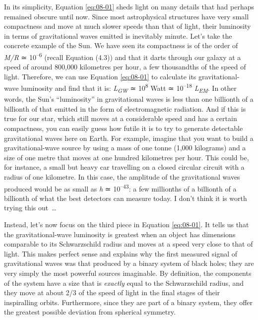 In its simplicity, Equation \eqref{eq:08-01} sheds light on many details that had perhaps remained
obscure until now. Since most astrophysical structures have very small compactness and
move at much slower speeds than that of light, their luminosity in terms of
gravitational waves emitted is inevitably minute. Let's take the concrete example of the
Sun. We have seen its compactness is of the order of \emph{M/R} ≃
10\textsuperscript{--6} (recall Equation (4.3)) and that it darts through our galaxy at
a speed of around 800,000 kilometres per hour, a few thousandths of the speed of light.
Therefore, we can use Equation \eqref{eq:08-01} to calculate its gravitational-wave luminosity and
find that it is: \emph{L\textsubscript{GW}} ≃ 10\textsuperscript{8} Watt ≃
10\textsuperscript{--18} \emph{L\textsubscript{EM}}. In other words, the Sun's
``luminosity''  in gravitational waves is less than one billionth of
a billionth of that emitted in the form of electromagnetic radiation.
And if this is true for our star, which still moves at a considerable speed and has a
certain compactness, you can easily guess how futile it is to try to generate detectable
gravitational waves here on Earth. For example, imagine that you want to build a
gravitational-wave source by using a mass of one tonne (1,000 kilograms) and a size of
one metre that moves at one hundred kilometres per hour. This could be, for instance, a
small but heavy car travelling on a closed circular circuit with a radius of one
kilometre. In this case, the amplitude of the gravitational waves produced would be as
small as \emph{h} ≃ 10\textsuperscript{--43}: a few millionths of a billionth of a
billionth of what the best detectors can measure today. I don't think it is worth trying
this out~\ldots{}

Instead, let's now focus on the third piece in Equation \eqref{eq:08-01}. It tells us that the
gravitational-wave luminosity is greatest when an object has
dimensions comparable to its Schwarzschild radius and moves at a speed very close to
that of light. This makes perfect sense and explains why the first measured signal of
gravitational waves was that produced by a binary system of black holes; they are very
simply the most powerful sources imaginable. By definition, the components of the system
have a size that is \emph{exactly} equal to the Schwarzschild radius, and they move at
about 2/3 of the speed of light in the final stages of their inspiralling
orbits. Furthermore, since they are part of a binary system, they
offer the greatest possible deviation from spherical symmetry.

